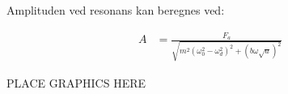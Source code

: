 \documentclass[answers,a4paper,12pt]{exam}
\begin{document}
\begin{questions}
\begin{parts}
\begin{solution}
Amplituden ved resonans kan beregnes ved:

\begin{align}
A &= \frac{F_{a}}{\sqrt{m^{2}\left(\omega_{0}^{2}-\omega_{d}^{2}\right)^{2}+(b \omega \sqrt{a})^{2}}}
\end{align}

PLACE GRAPHICS HERE
\end{solution}

\end{parts}

\end{questions}
\end{document}
